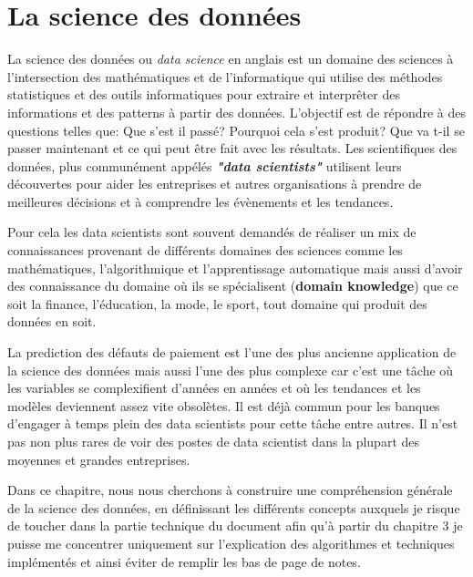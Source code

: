 \chapter{La science des données}
\label{chapter2}
La science des données ou \textit{data science} en anglais est un domaine des sciences à l'intersection des mathématiques et de l'informatique qui utilise des méthodes statistiques et des outils informatiques pour extraire et interprêter des informations et des patterns à partir des données. L’objectif est de répondre à des questions telles que: Que s’est il passé? Pourquoi cela s’est produit? Que va t-il se passer maintenant et ce qui peut être fait avec les résultats. Les scientifiques des données, plus communément appélés \textbf{\textit{"data scientists"}} utilisent leurs découvertes pour aider les entreprises et autres organisations à prendre de meilleures décisions et à comprendre les évènements et les tendances.

Pour cela les data scientists sont souvent demandés de réaliser un mix de connaissances provenant de différents domaines des sciences comme les mathématiques, l'algorithmique et l'apprentissage automatique mais aussi d'avoir des connaissance du domaine où ils se spécialisent (\textbf{domain knowledge}) que ce soit la finance, l'éducation, la mode, le sport, tout domaine qui produit des données en soit.

La prediction des défauts de paiement est l'une des plus ancienne application de la science des données mais aussi l'une des plus complexe car c'est une tâche où les variables se complexifient d'années en années et où les tendances et les modèles deviennent assez vite obsolètes. Il est déjà commun pour les banques d'engager à temps plein des data scientists pour cette tâche entre autres. Il n'est pas non plus rares de voir des postes de data scientist dans la plupart des moyennes et grandes entreprises.

Dans ce chapitre, nous nous cherchons à construire une compréhension générale de la science des données, en définissant les différents concepts auxquels je risque de toucher dans la partie technique du document afin qu'à partir du chapitre 3 je puisse me concentrer uniquement sur l'explication des algorithmes et techniques implémentés et ainsi éviter de remplir les bas de page de notes.




\clearpage